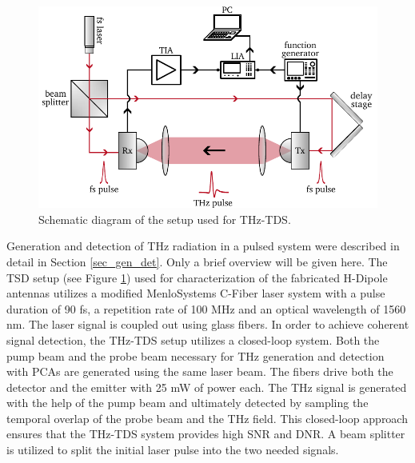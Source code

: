 \begin{figure}[ht]
    \includegraphics[width=0.9\linewidth]{figures/TDS_schematic.pdf}
    \centering
    \caption{Schematic diagram of the setup used for THz-TDS.}
    \label{fig_TDS}
\end{figure}

Generation and detection of THz radiation in a pulsed system were described in detail in Section \ref{sec_gen_det}. Only a brief overview will be given here. The TSD setup (see Figure \ref{fig_TDS}) used for characterization of the fabricated H-Dipole antennas utilizes a modified MenloSystems C-Fiber \cite{FemtosecondErbiumLaser} laser system with a pulse duration of \num{90} \si{\femto \s}, a repetition rate of \num{100} \si{\mega \hertz} and an optical wavelength of \num{1560} \si{\nano \meter}. The laser signal is coupled out using glass fibers. In order to achieve coherent signal detection, the THz-TDS setup utilizes a closed-loop system. Both the pump beam and the probe beam necessary for THz generation and detection with PCAs are generated using the same laser beam. The fibers drive both the detector and the emitter with \num{25} \si{\milli \watt} of power each. The THz signal is generated with the help of the pump beam and ultimately detected by sampling the temporal overlap of the probe beam and the THz field. This closed-loop approach ensures that the THz-TDS system provides high SNR and DNR. A beam splitter is utilized to split the initial laser pulse into the two needed signals. 

